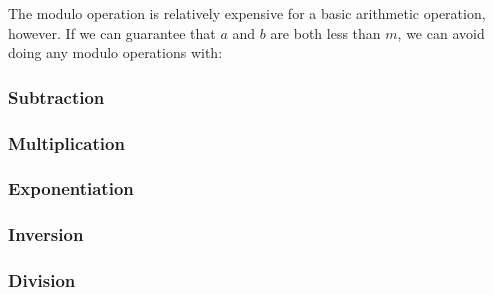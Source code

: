 
The modulo operation is relatively expensive for a basic arithmetic operation, however. If we can guarantee that $a$ and $b$ are both less than $m$, we can avoid doing any modulo operations with:


\subsubsection{Subtraction}

\subsubsection{Multiplication}

\subsubsection{Exponentiation}

\subsubsection{Inversion}

\subsubsection{Division}

